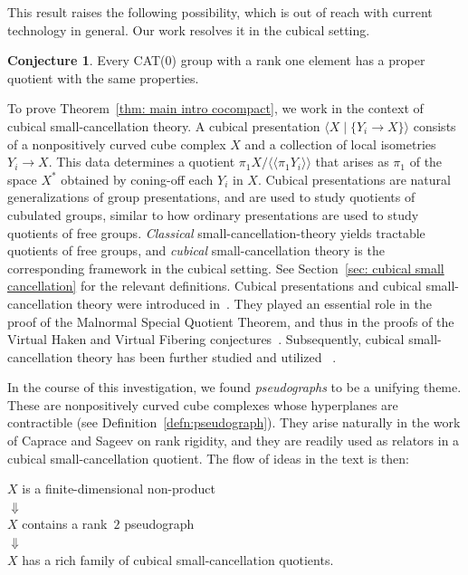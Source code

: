 \documentclass[12pt,oneside]{amsart}
\theoremstyle{definition}
\newtheorem{conjecture}[thm]{Conjecture}
\theoremstyle{definition}
\theoremstyle{remark}
\newcommand{\nclose}[1]{\ensuremath{\langle\!\langle#1\rangle\!\rangle}}
\begin{document}
This result raises the following possibility, which is out of reach with current technology in general. Our work resolves it in the cubical setting.

\begin{conjecture}\label{conj: CAT(0)}
    Every CAT(0) group with a rank one element has a proper quotient with the same properties.
\end{conjecture}

To prove Theorem~\ref{thm: main intro cocompact}, we work in the context of cubical small-cancellation theory. A cubical presentation $\langle X \mid \{Y_i \rightarrow X\} \rangle$ consists of   a nonpositively curved cube complex $X$ and a collection of local isometries $Y_i \rightarrow X$. This data determines a quotient $\pi_1X /\nclose{\pi_1Y_i}$ that arises as $\pi_1$ of the space $X^*$ obtained by coning-off each $Y_i$ in $X$. Cubical presentations  are natural generalizations of  group presentations, and are used to study  quotients of  cubulated groups, similar to how ordinary presentations are used to study quotients of free groups. 
\emph{Classical} small-cancellation-theory yields tractable quotients of free groups, and \emph{cubical} small-cancellation theory is the corresponding framework in the cubical setting. See Section~\ref{sec: cubical small cancellation} for the relevant definitions. 
Cubical presentations and cubical small-cancellation theory were introduced in~\cite{WiseBook}. They played an essential role in the proof of the
Malnormal Special Quotient Theorem, and  thus in
the proofs of the Virtual Haken and Virtual Fibering conjectures~\cite{AgolGrovesManning2012}. 
Subsequently, cubical small-cancellation theory has been further studied and utilized 
~\cite{Jankiewicz2017, ArzhantsevaHagen16, JankiewiczWise18, Arenas24IMRN, FuterWise, Arenas24asph, HuangWiseSpecial, ArenasAGT, ArenasJankiewiczWise}. 


In the course of this investigation, we found \emph{pseudographs} to be a unifying theme. These are nonpositively curved cube complexes whose hyperplanes are contractible (see Definition~\ref{defn:pseudograph}). They arise naturally in the work of Caprace and Sageev on rank rigidity, and they are readily used as relators in a cubical small-cancellation quotient.
The flow of ideas in the text is then:\vspace{10pt}

\begin{center}
$X$ is a finite-dimensional non-product\\ 
$\Downarrow$\\
$X$ contains a rank~$2$ pseudograph \\
$\Downarrow$\\
$X$ has a rich family of cubical small-cancellation quotients.\\    
\end{center}
\end{document}
